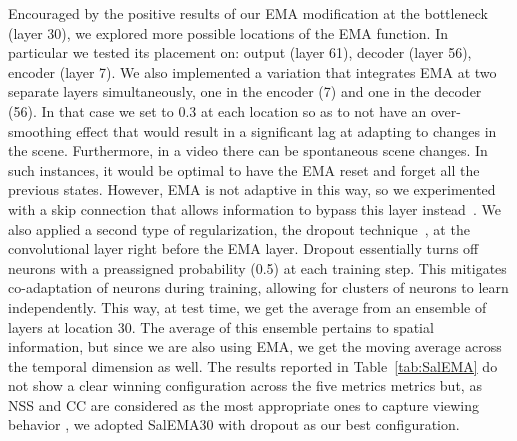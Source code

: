 \documentclass{bmvc2k}
\begin{document}
Encouraged by the positive results of our EMA modification at the bottleneck (layer 30), we explored more possible locations of the EMA function. In particular we tested its placement on: output (layer 61), decoder (layer 56), encoder (layer 7). We also implemented a variation that integrates EMA at two separate layers simultaneously, one in the encoder (7) and one in the decoder (56). In that case we set  to 0.3 at each location so as to not have an over-smoothing effect that would result in a significant lag at adapting to changes in the scene. 
Furthermore, in a video there can be spontaneous scene changes. In such instances, it would be optimal to have the EMA reset and forget all the previous states. However, EMA is not adaptive in this way, so we experimented with a skip connection that allows information to bypass this layer instead~\cite{ResNet}. We also applied a second type of regularization, the dropout technique~\cite{Dropout}, at the convolutional layer right before the EMA layer. Dropout essentially turns off neurons with a preassigned probability (0.5) at each training step. This mitigates co-adaptation of neurons during training, allowing for clusters of neurons to learn independently. This way, at test time, we get the average from an ensemble of layers at location 30. The average of this ensemble pertains to spatial information, but since we are also using EMA, we get the moving average across the temporal dimension as well. 
The results reported in Table~\ref{tab:SalEMA} do not show a clear winning configuration across the five metrics metrics but, as NSS and CC are considered as the most appropriate ones to capture viewing behavior \cite{bylinskii2019different}, we adopted SalEMA30 with dropout as our best configuration. 
\end{document}
